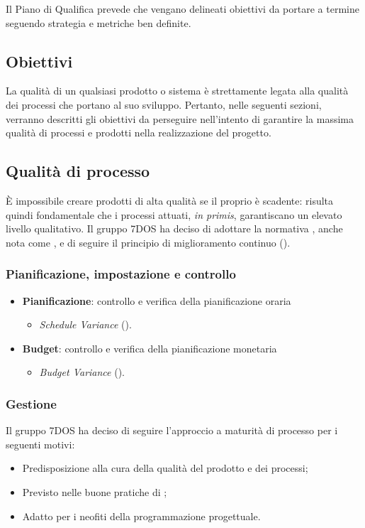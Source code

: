 Il Piano di Qualifica prevede che vengano delineati obiettivi da portare a termine seguendo strategia e metriche ben definite.
\subsection{Obiettivi}
La qualità di un qualsiasi prodotto o sistema è strettamente legata alla qualità dei processi che portano al suo sviluppo. Pertanto, nelle seguenti sezioni, verranno descritti gli obiettivi da perseguire nell'intento di garantire la massima qualità di processi e prodotti nella realizzazione del progetto.
\subsection{Qualità di processo}
	È impossibile creare prodotti di alta qualità se il proprio  è scadente: risulta quindi fondamentale che i processi attuati, \emph{in primis}, garantiscano un elevato livello qualitativo. Il gruppo 7DOS ha deciso di adottare la normativa , anche nota come , e di seguire il principio di miglioramento continuo (). 

\subsubsection{Pianificazione, impostazione e controllo}

\begin{itemize}
	\item{\textbf{Pianificazione}: controllo e verifica della pianificazione oraria
	\begin{itemize}
		\item{\emph{Schedule Variance} ().}
	\end{itemize}	
	}
	\item{\textbf{Budget}: controllo e verifica della pianificazione monetaria
		\begin{itemize}
			\item{\emph{Budget Variance} ().}
		\end{itemize}	
	}
\end{itemize}


\subsubsection{Gestione}
	Il gruppo 7DOS ha deciso di seguire l'approccio a maturità di processo per i seguenti motivi:
	\begin{itemize}
	\item Predisposizione alla cura della qualità del prodotto e dei processi;
	\item Previsto nelle buone pratiche di ;
	\item Adatto per i neofiti della programmazione progettuale.
	\end{itemize}
	
